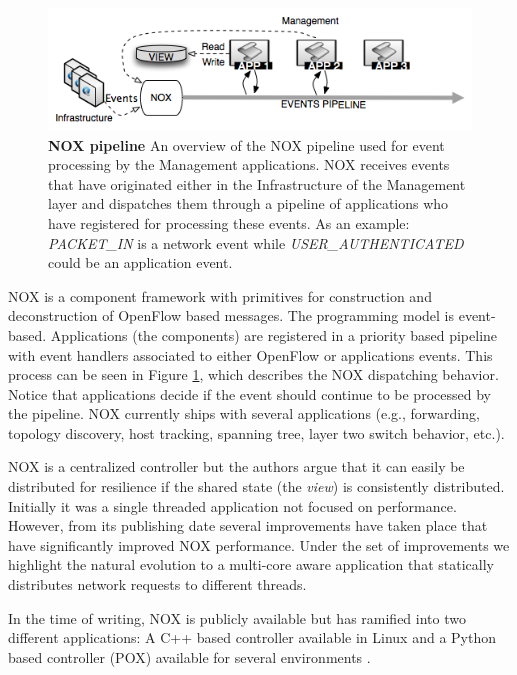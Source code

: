 \begin{figure}
  \centering 
  \footnotesize
  \includegraphics[scale=0.5]{pic/nox-pipeline}
  \caption[NOX pipeline] {\textbf{NOX pipeline} An overview of the NOX
    pipeline used for event processing by the Management applications. NOX
  receives events that have originated either in the Infrastructure of
the Management layer and dispatches them through a pipeline of
applications who have registered for processing these events. 
 As an example: \emph{PACKET\_IN} is a network event while
\emph{USER\_AUTHENTICATED} could be an application event.}
  \label{fig:nox-pipeline}
\end{figure}

NOX is a component framework with primitives for
construction and deconstruction of OpenFlow
based messages. The programming model is event-based. Applications (the components) are registered in a
priority based pipeline with event handlers associated to either
OpenFlow or applications events. This process can be seen in Figure
\ref{fig:nox-pipeline}, which describes the NOX dispatching behavior. Notice
that applications decide if the event should continue to be processed
by the pipeline. NOX  currently ships
with several applications (e.g., forwarding, topology discovery, host
tracking, spanning tree, layer two switch behavior, etc.).

NOX is a centralized controller  but the authors argue that it can easily be distributed for resilience if the shared state (the \emph{view}) is consistently distributed. 
Initially it was a single threaded application not focused on
performance. However, from its publishing date 
several improvements have taken place
\cite{Tootoonchian:2012uia,zen-doc-thesis} that have significantly improved
NOX performance. Under the set of improvements we highlight the
natural evolution to a multi-core aware application
that statically distributes network requests to different threads. 

In the time of writing, NOX is publicly available but has ramified into
two different applications: A C++ based controller available in
Linux and a Python  based controller (POX) available for
several environments \cite{nox}.

